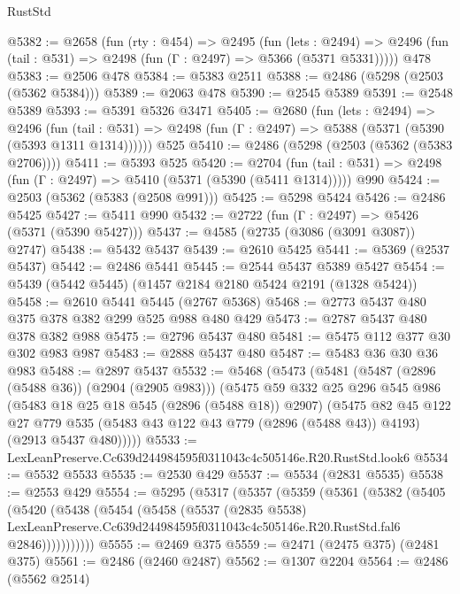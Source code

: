 \begin{lexlean}{RustStd}
\begin{coremodule}
@5382 := @2658
    (fun (rty : @454) =>
    @2495
      (fun (lets : @2494) =>
      @2496 (fun (tail : @531) => @2498 (fun (Γ : @2497) => @5366 (@5371 @5331)))))
    @478
@5383 := @2506 @478
@5384 := @5383 @2511
@5388 := @2486 (@5298 (@2503 (@5362 @5384)))
@5389 := @2063 @478
@5390 := @2545 @5389
@5391 := @2548 @5389
@5393 := @5391 @5326 @3471
@5405 := @2680
    (fun (lets : @2494) =>
    @2496
      (fun (tail : @531) => @2498 (fun (Γ : @2497) => @5388 (@5371 (@5390 (@5393 @1311 @1314))))))
    @525
@5410 := @2486 (@5298 (@2503 (@5362 (@5383 @2706))))
@5411 := @5393 @525
@5420 := @2704
    (fun (tail : @531) => @2498 (fun (Γ : @2497) => @5410 (@5371 (@5390 (@5411 @1314)))))
    @990
@5424 := @2503 (@5362 (@5383 (@2508 @991)))
@5425 := @5298 @5424
@5426 := @2486 @5425
@5427 := @5411 @990
@5432 := @2722 (fun (Γ : @2497) => @5426 (@5371 (@5390 @5427)))
@5437 := @4585 (@2735 (@3086 (@3091 @3087)) @2747)
@5438 := @5432 @5437
@5439 := @2610 @5425
@5441 := @5369 (@2537 @5437)
@5442 := @2486 @5441
@5445 := @2544 @5437 @5389 @5427
@5454 := @5439 (@5442 @5445) (@1457 @2184 @2180 @5424 @2191 (@1328 @5424))
@5458 := @2610 @5441 @5445 (@2767 @5368)
@5468 := @2773 @5437 @480 @375 @378 @382 @299 @525 @988 @480 @429
@5473 := @2787 @5437 @480 @378 @382 @988
@5475 := @2796 @5437 @480
@5481 := @5475 @112 @377 @30 @302 @983 @987
@5483 := @2888 @5437 @480
@5487 := @5483 @36 @30 @36 @983
@5488 := @2897 @5437
@5532 := @5468
    (@5473
      (@5481
        (@5487 (@2896 (@5488 @36)) (@2904 (@2905 @983)))
        (@5475
          @59
          @332
          @25
          @296
          @545
          @986
          (@5483 @18 @25 @18 @545 (@2896 (@5488 @18)) @2907)
          (@5475
            @82
            @45
            @122
            @27
            @779
            @535
            (@5483 @43 @122 @43 @779 (@2896 (@5488 @43)) @4193)
            (@2913 @5437 @480)))))
@5533 := LexLeanPreserve.Cc639d244984595f0311043c4c505146e.R20.RustStd.look6
@5534 := @5532 @5533
@5535 := @2530 @429
@5537 := @5534 (@2831 @5535)
@5538 := @2553 @429
@5554 := @5295
    (@5317
      (@5357
        (@5359
          (@5361
            (@5382
              (@5405
                (@5420
                  (@5438
                    (@5454
                      (@5458
                        (@5537
                          (@2835 @5538)
                          LexLeanPreserve.Cc639d244984595f0311043c4c505146e.R20.RustStd.fal6
                          @2846)))))))))))
@5555 := @2469 @375
@5559 := @2471 (@2475 @375) (@2481 @375)
@5561 := @2486 (@2460 @2487)
@5562 := @1307 @2204
@5564 := @2486 (@5562 @2514)

\end{coremodule}
\end{lexlean}
